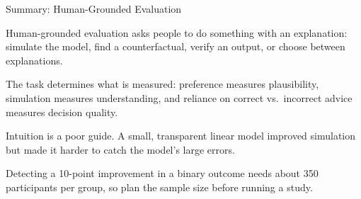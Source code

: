 \documentclass[10pt,compress,t,notes=noshow, xcolor=table]{beamer}
\begin{document}
\begin{framev}[align=mid]{Summary: Human-Grounded Evaluation}
\begin{itemizeM}
\item Human-grounded evaluation asks people to do something with an explanation: simulate the model, find a counterfactual, verify an output, or choose between explanations.
\item The task determines what is measured: preference measures plausibility, simulation measures understanding, and reliance on correct vs.\ incorrect advice measures decision quality.
\item Intuition is a poor guide. A small, transparent linear model improved simulation but made it harder to catch the model's large errors.
\item Detecting a 10-point improvement in a binary outcome needs about 350 participants per group, so plan the sample size before running a study.
\end{itemizeM}
\end{framev}


\endlecture
\end{document}
